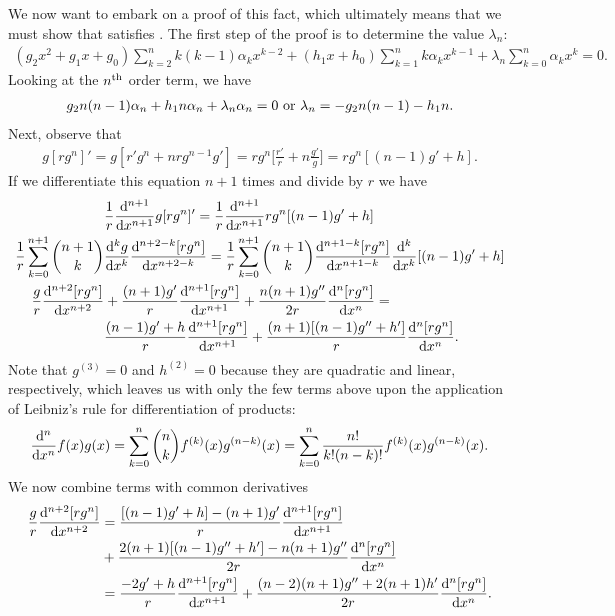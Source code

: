 We now want to embark on a proof of this fact, which ultimately means that we must show that  satisfies .
The first step of the proof is to determine the value $\lambda_{n}$:
\begin{align}
    (g_2x^2 + g_1x + g_0) \sum_{k=2}^{n} k(k-1) \alpha_{k} x^{k-2} + (h_1 x + h_0) \sum_{k=1}^{n} k \alpha_{k} x^{k-1} + \lambda_{n} \sum_{k=0}^{n} \alpha_{k} x^{k} = 0
.\end{align}
Looking at the $n^{\rm th}$ order term, we have
\begin{eqnarray}
    g_2 n(n-1) \alpha_{n} + h_1 n \alpha_{n} + \lambda_{n} \alpha_{n} = 0 ~{\rm or}~ \lambda_{n} = -g_2 n(n-1) - h_1 n
.\end{eqnarray}
Next, observe that
\begin{eqnarray}
    g[r g^{n}]' = g [ r' g^{n} + n r g^{n-1} g' ] = r g^{n} \Big[ \frac{r'}{r} + n \frac{g'}{g} \Big] = r g^{n} [ (n-1)g' + h ]
.\end{eqnarray}
If we differentiate this equation $n + 1$ times and divide by $r$ we have
\begin{align}
    &\frac{1}{r} \dv[n+1]{x} g [ rg^{n} ]' = \frac{1}{r} \dv[n+1]{x} rg^{n} [ (n-1)g' + h ] \nonumber \\
    \frac{1}{r} \sum_{k=0}^{n+1} \binom{n+1}{k} &\dv[k]{g}{x} \dv[n+2-k]{[rg^{n}]}{x} = \frac{1}{r} \sum_{k=0}^{n+1} \binom{n+1}{k} \dv[n+1-k]{[rg^{n}]}{x} \dv[k]{x} [ (n-1)g' + h ] \nonumber \\
    \frac{g}{r} \dv[n+2]{[rg^{n}]}{x} &+ \frac{(n+1)g'}{r} \dv[n+1]{[rg^{n}]}{x} + \frac{n(n+1) g''}{2r} \dv[n]{[rg^{n}]}{x} = \nonumber \\
    &\frac{(n-1)g' + h}{r} \dv[n+1]{[rg^{n}]}{x} + \frac{(n+1)[ (n-1)g'' + h' ]}{r} \dv[n]{[rg^{n}]}{x} \nonumber
.\end{align}
Note that $g^{(3)} = 0$ and $h^{(2)} = 0$ because they are quadratic and linear, respectively, which leaves us with only the few terms above upon the application of Leibniz's rule for differentiation of products:
\begin{align}
    \dv[n]{x} f(x) g(x) = \sum_{k=0}^{n} \binom{n}{k} f^{(k)}(x) g^{(n-k)}(x) = \sum_{k=0}^{n} \frac{n!}{k!(n-k)!} f^{(k)}(x) g^{(n-k)}(x)
.\end{align}
We now combine terms with common derivatives 
\begin{align}
    \frac{g}{r} \dv[n+2]{[rg^{n}]}{x} &= \frac{[(n-1)g' + h] - (n+1)g'}{r} \dv[n+1]{[rg^{n}]}{x} \nonumber \\
    &+ \frac{2(n+1)[(n-1)g'' + h'] - n(n+1)g''}{2r} \dv[n]{[rg^{n}]}{x} \nonumber \\
    &= \frac{-2g' + h}{r} \dv[n+1]{[rg^{n}]}{x} + \frac{(n-2)(n+1)g'' + 2(n+1)h'}{2r} \dv[n]{[rg^{n}]}{x}
.\end{align}
